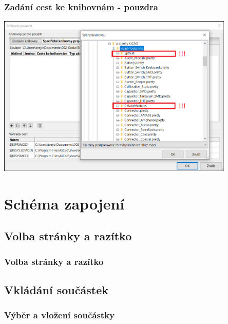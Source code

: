 \documentclass{beamer}
\begin{document}
\begin{frame}
	\frametitle{Zadání cest ke knihovnám - pouzdra}

		\begin{center}
			\includegraphics[width=0.85\textwidth]{obr/knihovny08.png}
		\end{center}
		
\end{frame}

\section{\texorpdfstring{Schéma zapojení}{Schema zapojeni}}
\subsection{\texorpdfstring{Volba stránky a razítko}{Volba stranky a razitko}}
\begin{frame}
	\frametitle{Volba stránky a razítko}
		
\end{frame}


\subsection{\texorpdfstring{Vkládání součástek}{Vkladani soucastek}}
\begin{frame}
	\frametitle{Výběr a vložení součástky}
		
\end{frame}
\end{document}
